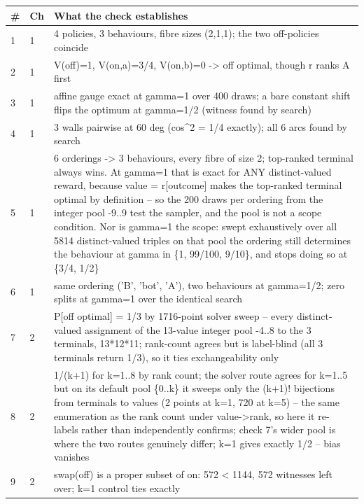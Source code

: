 \noindent
\begin{tabularx}{\textwidth}{llX}
\toprule
\# & Ch & What the check establishes \\
\midrule
1 & 1 & 4 policies, 3 behaviours, fibre sizes (2,1,1); the two off-policies coincide \\
2 & 1 & V(off)=1, V(on,a)=3/4, V(on,b)=0 -> off optimal, though r ranks A first \\
3 & 1 & affine gauge exact at gamma=1 over 400 draws; a bare constant shift flips the optimum at gamma=1/2 (witness found by search) \\
4 & 1 & 3 walls pairwise at 60 deg (cos\textasciicircum{}2 = 1/4 exactly); all 6 arcs found by search \\
5 & 1 & 6 orderings -> 3 behaviours, every fibre of size 2; top-ranked terminal always wins. At gamma=1 that is exact for ANY distinct-valued reward, because value = r[outcome] makes the top-ranked terminal optimal by definition -- so the 200 draws per ordering from the integer pool -9..9 test the sampler, and the pool is not a scope condition. Nor is gamma=1 the scope: swept exhaustively over all 5814 distinct-valued triples on that pool the ordering still determines the behaviour at gamma in \{1, 99/100, 9/10\}, and stops doing so at \{3/4, 1/2\} \\
6 & 1 & same ordering ('B', 'bot', 'A'), two behaviours at gamma=1/2; zero splits at gamma=1 over the identical search \\
7 & 2 & P[off optimal] = 1/3 by 1716-point solver sweep -- every distinct-valued assignment of the 13-value integer pool -4..8 to the 3 terminals, 13*12*11; rank-count agrees but is label-blind (all 3 terminals return 1/3), so it ties exchangeability only \\
8 & 2 & 1/(k+1) for k=1..8 by rank count; the solver route agrees for k=1..5 but on its default pool \{0..k\} it sweeps only the (k+1)! bijections from terminals to values (2 points at k=1, 720 at k=5) -- the same enumeration as the rank count under value->rank, so here it re-labels rather than independently confirms; check 7's wider pool is where the two routes genuinely differ; k=1 gives exactly 1/2 -- bias vanishes \\
9 & 2 & swap(off) is a proper subset of on: 572 < 1144, 572 witnesses left over; k=1 control ties exactly \\
\bottomrule
\end{tabularx}
\par\medskip
\noindent
